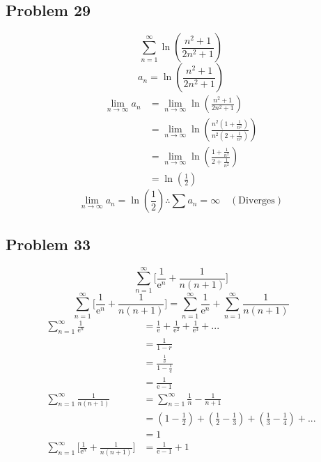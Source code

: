 \documentclass[letterpaper, 12pt]{article}
\newcommand*{\e}{\mathrm{e}}
\begin{document}
\subsection*{Problem 29}
\[ \sum_{n=1}^{\infty}\ln(\frac{n^{2}+1}{2n^{2}+1}) \]
\[ a_{n} = \ln(\frac{n^{2}+1}{2n^{2}+1}) \]
\begin{align*}
  \lim_{n\to\infty}a_{n} &= \lim_{n\to\infty}\ln(\frac{n^{2}+1}{2n^{2}+1}) \\
  &= \lim_{n\to\infty}
    \ln(\frac{n^{2}(1+\frac{1}{n^{2}})}{n^{2}(2+\frac{1}{n^{2}})}) \\
  &= \lim_{n\to\infty}
    \ln(\frac{1+\frac{1}{n^{2}}}{2+\frac{1}{n^{2}}}) \\
  &= \ln(\frac{1}{2})
\end{align*}
\[ \lim_{n\to\infty}a_{n} = \ln(\frac{1}{2}) \therefore
   \sum{a_{n}} = \infty \quad \mathrm{(Diverges)} \]

\subsection*{Problem 33}
\[ \sum_{n=1}^{\infty}\bigg[\frac{1}{\e^{n}}+\frac{1}{n(n+1)}\bigg] \]
\[ \sum_{n=1}^{\infty}\bigg[\frac{1}{\e^{n}}+\frac{1}{n(n+1)}\bigg] =
   \sum_{n=1}^{\infty}\frac{1}{\e^{n}}+\sum_{n=1}^{\infty}\frac{1}{n(n+1)} \]
\begin{align*}
  \sum_{n=1}^{\infty}\frac{1}{\e^{n}} &=
    \frac{1}{\e}+\frac{1}{\e^{2}}+\frac{1}{\e^{3}}+... \\
  &= \frac{1}{1-r} \\
  &= \frac{\frac{1}{\e}}{1-\frac{1}{\e}} \\
  &= \frac{1}{\e-1} \\
  \sum_{n=1}^{\infty}\frac{1}{n(n+1)} &=
    \sum_{n=1}^{\infty}\frac{1}{n}-\frac{1}{n+1} \\
  &= (1-\frac{1}{2})+(\frac{1}{2}-\frac{1}{3})+(\frac{1}{3}-\frac{1}{4})+... \\
  &= 1 \\
  \sum_{n=1}^{\infty}\bigg[\frac{1}{\e^{n}}+\frac{1}{n(n+1)}\bigg] &=
    \frac{1}{\e-1}+1
\end{align*}
\end{document}
